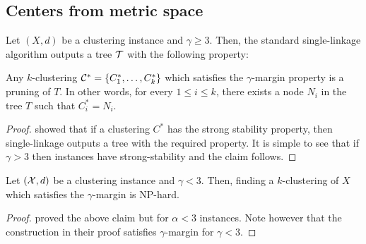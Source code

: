 \subsection{Centers from metric space}
\begin{theorem}
\label{thm:upperCenterMetric}
Let $(X , d)$ be a clustering instance and $\gamma \ge 3$. Then, the standard single-linkage algorithm outputs a tree $\mathcal T$ with the following property:


Any $k$-clustering $\mathcal C^* = \{C_1^*, \ldots, C_k^* \}$ which satisfies the $\gamma$-margin property is a pruning of $T$. In other words, for every $1 \le i \le k$, there exists a node $N_i$ in the tree $T$ such that $C_i^* = N_i$. 
\end{theorem}

\begin{proof}
\cite{balcan2008discriminative} showed that if a clustering $C^*$ has the strong stability property, then single-linkage outputs a tree with the required property. It is simple to see that if $\gamma > 3$ then instances have strong-stability and the claim follows.  
\end{proof}


\begin{theorem}
\label{thm:lowerCenterMetric}
Let $(\mathcal X, d)$ be a clustering instance and $\gamma < 3$. Then, finding a $k$-clustering of $X$ which satisfies the $\gamma$-margin is NP-hard.
\end{theorem}
\begin{proof}
\cite{awasthi2012center} proved the above claim but for $\alpha < 3$ instances. Note however that the construction in their proof satisfies $\gamma$-margin for $\gamma < 3$. 
\end{proof}




